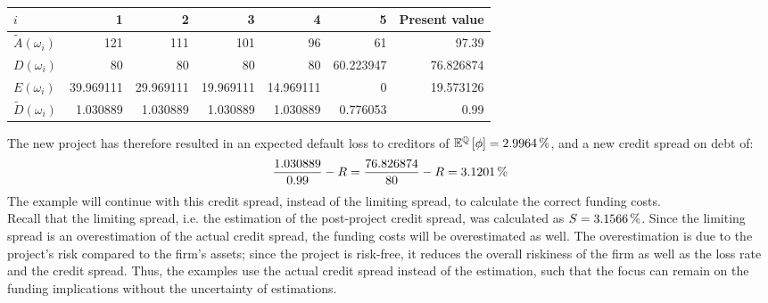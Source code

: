 \documentclass[main.tex]{subfiles}
\begin{document}
        \begin{table}[H]
            \centering
            \begin{tabular}{l|rrrrr||r}
                $i$ & 1 & 2 & 3 & 4 & 5 & Present value \\
                \hline
                \rule{0pt}{1.1em}
                $\tilde{A}(\omega_{i})$ 
                    & \num{121} & \num{111} & \num{101} & \num{96} & \num{61} & \num{97.39} \\
                $D(\omega_{i})$ 
                    & \num{80} & \num{80} & \num{80} & \num{80} & \num{60.223947} & \num{76.826874} \\
                $E(\omega_{i})$ 
                    & \num{39.969111} & \num{29.969111} & \num{19.969111} & \num{14.969111} & \num{0} & \num{19.573126} \\
                $\tilde{D}(\omega_{i})$ 
                    & \num{1.030889} & \num{1.030889} & \num{1.030889} & \num{1.030889} & \num{0.776053} & \num{0.99} \\
            \end{tabular}
            \caption{}
            \label{tbl:debt-issuance-payoffs}
        \end{table}

        The new project has therefore resulted in an expected default loss to creditors of 
        $\mathbb{E}^{\rnmeasure}\left[\phi\right] = \pct{0.029964}$,
        and a new credit spread on debt of:
        \begin{equation*}
            \frac{
                1.030889
            }{    
                0.99
            } 
            -
            R
            = 
            \frac{
                76.826874
            }{    
                80
            } 
            -
            R
            =
            \pct{0.031201}
        \end{equation*}
        The example will continue with this credit spread, instead of the limiting spread,
        to calculate the correct funding costs.
        \\
        Recall that the limiting spread, i.e. the estimation of the post-project credit spread, 
        was calculated as $S = \pct{0.031566}$.
        Since the limiting spread is an overestimation of the actual credit spread,
        the funding costs will be overestimated as well.
        The overestimation is due to the project's risk compared to the firm's assets;
        since the project is risk-free, it reduces the overall riskiness of the firm
        as well as the loss rate and the credit spread.
        Thus, the examples use the actual credit spread instead of the estimation, 
        such that the focus can remain on the funding implications
        without the uncertainty of estimations.
\end{document}

